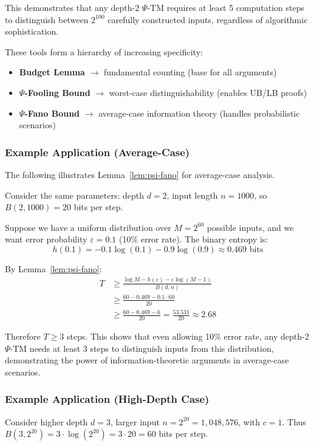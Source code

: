 This demonstrates that any depth-2 $\Psi$-TM requires at least 5 computation steps to distinguish between $2^{100}$ carefully constructed inputs, regardless of algorithmic sophistication.

\begin{remark}
These tools form a hierarchy of increasing specificity:
\begin{itemize}
\item \textbf{Budget Lemma} $\to$ fundamental counting (base for all arguments)
\item \textbf{$\Psi$-Fooling Bound} $\to$ worst-case distinguishability (enables UB/LB proofs)
\item \textbf{$\Psi$-Fano Bound} $\to$ average-case information theory (handles probabilistic scenarios)
\end{itemize}
\end{remark}

\subsubsection{Example Application (Average-Case)}
The following illustrates Lemma~\ref{lem:psi-fano} for average-case analysis.

Consider the same parameters: depth $d = 2$, input length $n = 1000$, so $B(2,1000) = 20$ bits per step.

Suppose we have a uniform distribution over $M = 2^{60}$ possible inputs, and we want error probability $\varepsilon = 0.1$ (10\% error rate). The binary entropy is:
\[h(0.1) = -0.1 \log(0.1) - 0.9 \log(0.9) \approx 0.469 \text{ bits}\]

By Lemma~\ref{lem:psi-fano}:
\begin{align}
T &\geq \frac{\log M - h(\varepsilon) - \varepsilon \log(M-1)}{B(d,n)} \\
&\geq \frac{60 - 0.469 - 0.1 \cdot 60}{20} \\
&\geq \frac{60 - 0.469 - 6}{20} = \frac{53.531}{20} \approx 2.68
\end{align}

Therefore $T \geq 3$ steps. This shows that even allowing 10\% error rate, any depth-2 $\Psi$-TM needs at least 3 steps to distinguish inputs from this distribution, demonstrating the power of information-theoretic arguments in average-case scenarios.

\subsubsection{Example Application (High-Depth Case)}
Consider higher depth $d = 3$, larger input $n = 2^{20} = 1{,}048{,}576$, with $c = 1$.
Thus $B(3,2^{20}) = 3 \cdot \log(2^{20}) = 3 \cdot 20 = 60$ bits per step.

